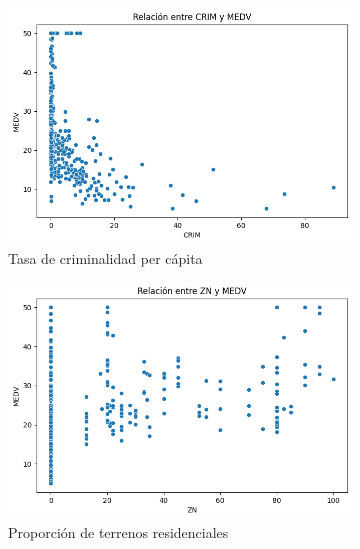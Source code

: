 \documentclass[12pt,a4paper]{article}
\begin{document}
\begin{figure}[H]
\centering
\begin{subfigure}[t]{0.24\textwidth}
    \centering
    \includegraphics[width=\textwidth]{images/crim_medv.png}
    \caption{\footnotesize Tasa de criminalidad per cápita}
    \label{fig:modelo_crim}
\end{subfigure}
\hfill
\begin{subfigure}[t]{0.24\textwidth}
    \centering
    \includegraphics[width=\textwidth]{images/zn_medv.png}
    \caption{\footnotesize Proporción de terrenos residenciales}
    \label{fig:modelo_zn}
\end{subfigure}
\hfill
\begin{subfigure}[t]{0.24\textwidth}
    \centering

\end{subfigure}
\end{figure}
\end{document}
